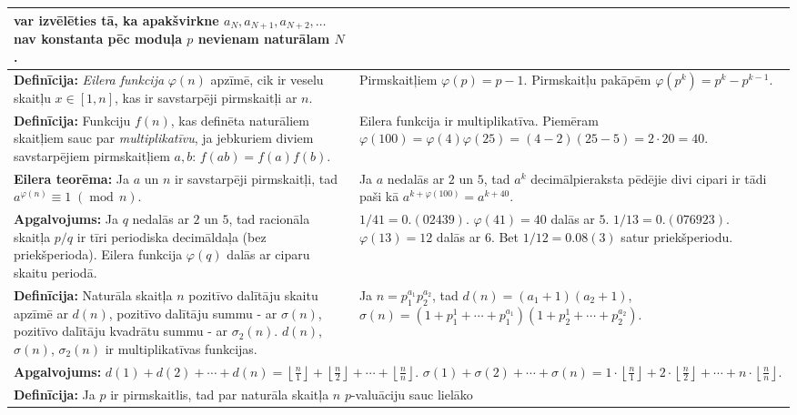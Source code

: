 \documentclass[a4paper]{article}
\begin{document}
\begin{table}[ht!]
{\begin{tabular*}{18.46cm}{@{}|p{10.35cm}|p{7.25cm}|@{}}
{var izvēlēties tā, ka apakšvirkne $a_{N},a_{N+1},a_{N+2},\ldots$ nav konstanta pēc moduļa $p$ nevienam naturālam $N$.
} \\ \hline
{\bf Definīcija:}
{\em Eilera funkcija} $\varphi(n)$ apzīmē, cik ir veselu skaitļu $x \in [1,n]$, kas ir savstarpēji pirmskaitļi 
ar $n$. &
Pirmskaitļiem $\varphi(p)=p-1$. Pirmskaitļu pakāpēm $\varphi(p^k)=p^k-p^{k-1}$.  
\\ \hline
{\bf Definīcija:}
Funkciju $f(n)$, kas definēta naturāliem skaitļiem  
sauc par {\em multiplikatīvu}, ja jebkuriem diviem savstarpējiem pirmskaitļiem $a,b$: $f(ab)=f(a)f(b)$.
& Eilera funkcija ir multiplikatīva. Piemēram $\varphi(100)=\varphi(4)\varphi(25)=(4-2)(25-5)=2\cdot{}20=40$. \\ \hline
{\bf Eilera teorēma:} Ja $a$ un $n$ ir savstarpēji pirmskaitļi, tad 
$a^{\varphi(n)} \equiv 1\;(\operatorname{mod}\,n)$. &
Ja $a$ nedalās ar $2$ un $5$, tad $a^k$ decimālpieraksta pēdējie divi cipari ir 
tādi paši kā $a^{k+\varphi(100)}=a^{k+40}$. \\ \hline
\cellcolor[HTML]{E1FFE1}
{\bf Apgalvojums:} Ja $q$ nedalās ar $2$ un $5$, tad racionāla skaitļa $p/q$ ir tīri periodiska decimāldaļa
(bez priekšperioda). Eilera funkcija $\varphi(q)$ dalās ar ciparu skaitu periodā. &
$1/41=0.(02439)$. $\varphi(41)=40$ dalās ar $5$.\newline
$1/13=0.(076923)$. $\varphi(13)=12$ dalās ar $6$. Bet $1/12=0.08(3)$ satur priekšperiodu. \\ \hline
{\bf Definīcija:} Naturāla skaitļa $n$ pozitīvo dalītāju skaitu apzīmē ar $d(n)$, 
pozitīvo dalītāju summu - ar $\sigma(n)$, pozitīvo dalītāju 
kvadrātu summu - ar $\sigma_2(n)$.
$d(n)$, $\sigma(n)$, $\sigma_2(n)$ ir multiplikatīvas funkcijas. &
Ja $n=p_1^{a_1}p_2^{a_2}$, tad $d(n)=(a_1+1)(a_2+1)$,\newline 
$\sigma(n)=\left(1+p_1^1+\cdots+p_1^{a_1}\right)\left(1+p_2^1+\cdots+p_2^{a_2}\right)$. \\ \hline
\multicolumn{2}{|p{18.05cm}|}{
\cellcolor[HTML]{E1FFE1}
{\bf Apgalvojums:}
$d(1)+d(2)+\cdots+d(n)=\left\lfloor \frac{n}{1} \right\rfloor + 
\left\lfloor \frac{n}{2} \right\rfloor + \cdots + 
\left\lfloor \frac{n}{n} \right\rfloor$.\newline
$\sigma(1)+\sigma(2)+\cdots+\sigma(n)=1\cdot\left\lfloor \frac{n}{1} \right\rfloor + 
2\cdot\left\lfloor \frac{n}{2} \right\rfloor + \cdots + 
n\cdot\left\lfloor \frac{n}{n} \right\rfloor$. 
} \\ \hline
\multicolumn{2}{|p{18.05cm}|}{
{\bf Definīcija:} Ja $p$ ir pirmskaitlis, tad par naturāla skaitļa $n$ $p$-valuāciju sauc lielāko 
}
\end{tabular*}}
\end{table}
\end{document}
